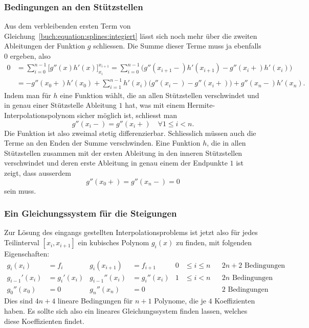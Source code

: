 \subsubsection{Bedingungen an den Stützstellen}
Aus dem verbleibenden ersten Term von
Gleichung~\eqref{buch:equation:splines:integiert}
lässt sich noch mehr über die zweiten Ableitungen der Funktion $g$
schliessen.
Die Summe dieser Terme muss ja ebenfalls $0$ ergeben, also
\begin{align*}
0
&=
\sum_{i=0}^{n-1} 
\biggl[ g''(x) h'(x) \biggr]_{x_i}^{x_{i+1}}
=
\sum_{i=0}^{n-1}
\bigl( g''(x_{i+1}-) h'(x_{i+1}) - g''(x_i+) h'(x_i) \bigr)
\\
&=
-g''(x_0+)h'(x_0)
+
\sum_{i=1}^{n-1} h'(x_i) \bigl(g''(x_i-) - g''(x_i+)\bigr)
+
g''(x_n-)h'(x_n).
\end{align*}
Indem man für $h$ eine Funktion wählt, die an allen Stützstellen verschwindet
und in genau einer Stützstelle Ableitung $1$ hat, was mit einem
Hermite-Interpolationspolynom sicher möglich ist, schliesst man
\begin{equation}
g''(x_i-)=g''(x_i+)\quad\forall 1\le i< n.
\label{buch:equation:splineinner}
\end{equation}
Die Funktion ist also zweimal stetig differenzierbar.
Schliesslich müssen auch die Terme an den Enden der Summe verschwinden.
Eine Funktion $h$, die in allen Stützstellen zusammen mit der ersten
Ableitung in den inneren Stützstellen verschwindet und deren
erste Ableitung in genau einem der Endpunkte $1$ ist zeigt,
dass ausserdem
\begin{equation}
g''(x_0+) = g''(x_n-) = 0
\label{buch:equation:splinerand}
\end{equation}
sein muss.

\subsubsection{Ein Gleichungssystem für die Steigungen}
Zur Lösung des eingangs gestellten Interpolationsproblems ist jetzt
also für jedes Teilinterval $[x_i,x_{i+1}]$ ein kubisches Polynom $g_i(x)$
zu finden, mit folgenden Eigenschaften:
\begin{align*}
g_i(x_i)     &=f_i       &g_i(x_{i+1})  &=f_{i+1}   &0&\le i\le n &&\text{$2n+2$ Bedingungen}
\\
g_{i-1}'(x_i)&=g_i'(x_i) &g_{i-1}''(x_i)&=g_i''(x_i)&1&\le i< n &&\text{$2n$ Bedingungen}
\\
g_0''(x_0)   &=0         &g_n''(x_n)    &= 0        & &         &&\text{$2$ Bedingungen}
\end{align*}
Dies sind $4n+4$ lineare Bedingungen für $n+1$ Polynome, die je $4$
Koeffizienten haben.
Es sollte sich also ein lineares Gleichungssystem finden lassen, welches
diese Koeffizienten findet.

